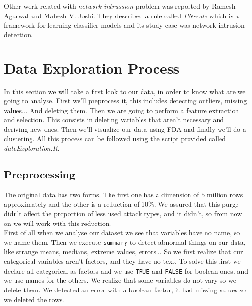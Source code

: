 \documentclass[a4paper]{article} %
\begin{document}
Other work related with \textit{network intrussion} problem was reported by Ramesh Agarwal and Mahesh V. Joshi. They described a rule called \textit{PN-rule} which is a framework for learning classifier models and its study case was network intrusion detection.

\section{Data Exploration Process}
In this section we will take a first look to our data, in order to know what are we going to analyse. First we'll preprocess it, this includes detecting outliers, missing values... And deleting them. Then we are going to perform a feature extraction and selection. This consists in deleting variables that aren't necessary and deriving new ones. Then we'll visualize our data using FDA and finally we'll do a clustering. All this process can be followed using the script provided called \textit{dataExploration.R}.\\

\subsection{Preprocessing}
The original data has two forms. The first one has a dimension of 5 million rows approximately and the other is a reduction of 10\%. We assured that this purge didn't affect the proportion of less used attack types, and it didn't, so from now on we will work with this reduction.\\

First of all when we analyse our dataset we see that variables have no name, so we name them. Then we execute \lstinline|summary| to detect abnormal things on our data, like strange means, medians, extreme values, errors... So we first realize that our categorical variables aren't factors, and they have no text. To solve this first we declare all categorical as factors and we use \lstinline|TRUE| and \lstinline|FALSE| for boolean ones, and we use names for the others. We realize that some variables do not vary so we delete them. We detected an error with a boolean factor, it had missing values so we deleted the rows.
\end{document}
